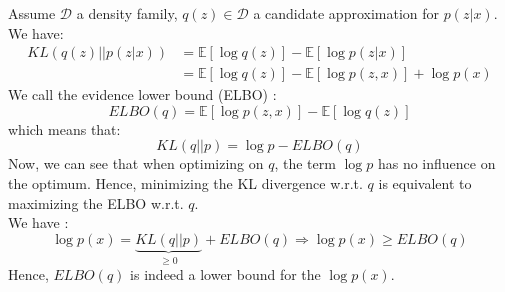 Assume $\mathcal{D}$ a density family, $q(z) \in \mathcal{D}$ a candidate approximation for $p(z|x)$. We have:
\begin{align}
KL(q(z)||p(z|x)) &= \mathbb{E}\left[\log q(z)\right] - \mathbb{E}\left[\log p(z|x)\right]\\
&= \mathbb{E}\left[\log q(z)\right] - \mathbb{E}\left[\log p(z,x)\right] + \log p(x)
\label{eq:KL_to_logP}
\end{align}
We call the evidence lower bound (ELBO) :
\begin{equation}
ELBO(q) = \mathbb{E}\left[\log p(z,x)\right] - \mathbb{E}\left[\log q(z)\right]
\label{eq:ELBO}
\end{equation}
which means that:
\begin{equation}
KL(q||p) = \log p - ELBO(q)
\label{eq:ELBO-KL}
\end{equation}
Now, we can see that when optimizing on $q$, the term $\log p$ has no influence on the optimum. Hence, minimizing the KL divergence w.r.t. $q$ is equivalent to maximizing the ELBO w.r.t. $q$.\\
\newline
We have :
\begin{equation}
\log p(x) = \underbrace{KL(q||p)}_{\geq 0} + ELBO(q) \Rightarrow \log p(x) \geq ELBO(q)
\label{eq:ELBO+KL}
\end{equation}
Hence, $ELBO(q)$ is indeed a lower bound for the $\log p(x)$.